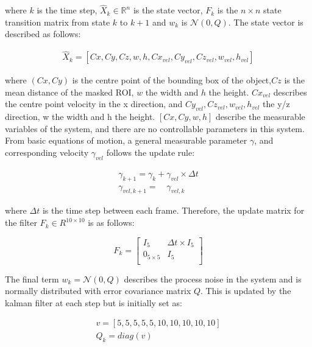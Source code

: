 \documentclass[a4paper,11pt,notitlepage]{article}
\begin{document}
where $k$ is the time step, $\hat{X}_{k} \in \mathbb{R}^{n}$ is the state vector, $F_{k}$ is the $n \times n$ state transition matrix from state $k$ to $k+1$ and $w_{k}$ is $\mathcal{N}(0,Q)$. The state vector is described as follows:

\begin{equation}
\begin{aligned}
\hat{X}_{k} =  [Cx,Cy,Cz,w,h,Cx_{vel},Cy_{vel},Cz_{vel},w_{vel},h_{vel}]
\end{aligned}
\end{equation}

where $(Cx,Cy)$ is the centre point of the bounding box of the object,$Cz$ is the mean distance of the masked ROI, $w$ the width and $h$ the height. $Cx_{vel}$ describes the centre point velocity in the x direction, and $Cy_{vel},Cz_{vel},w_{vel},h_{vel}$ the y/z direction, w the width and h the height. $[Cx,Cy,w,h]$ describe the measurable variables of the system, and there are no controllable parameters in this system. From basic equations of motion, a general measurable parameter $\gamma$, and corresponding velocity  $\gamma_{vel}$ follows the update rule:

\begin{equation}
\begin{aligned}
\gamma_{k+1} = \gamma_{k} + \gamma_{vel} \times \Delta t \\
\gamma_{vel,k+1} = \quad \gamma_{vel,k}
\end{aligned}
\end{equation}

where $\Delta t$ is the time step between each frame. Therefore, the update matrix for the filter $F_{k} \in R^{10 \times 10}$ is as follows:

\begin{equation}
F_{k} = 
\begin{bmatrix}
I_{5} & \Delta t \times I_{5} \\[0.3em]

0_{5 \times 5} & I_{5} \\[0.3em]
\end{bmatrix}
\end{equation}

The final term $w_{k} = \mathcal{N}(0,Q)$ describes the process noise in the system and is normally distributed with error covariance matrix $Q$. This is updated by the kalman filter at each step but is initially set as:

\begin{equation}
\begin{aligned}
v = [5,5,5,5,5,10,10,10,10,10] \\
Q_{k} = diag(v)
\end{aligned}
\end{equation}
\end{document}
